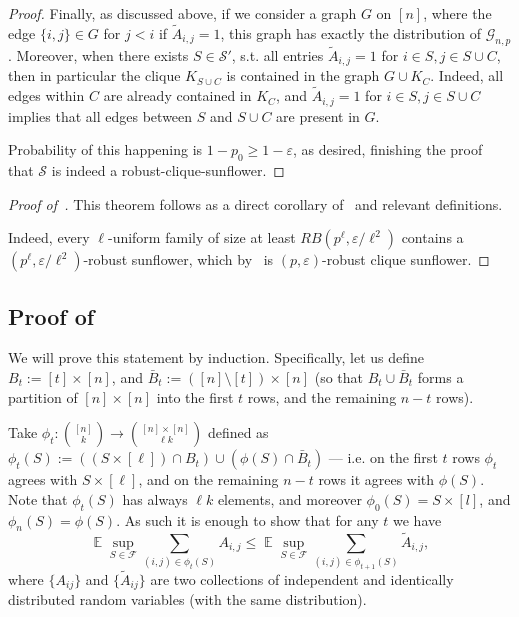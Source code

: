 \documentclass[10pt,a4paper]{article}
\DeclareMathOperator{\E}{\mathbb{E}}
\begin{document}
\begin{proof}
Finally, as discussed above, if we consider a graph $G$ on $[n]$, where the edge $\{i,j\} \in G$ for $j < i$ if $\tilde{A}_{i,j} = 1$, this graph has exactly the distribution of $\mathcal{G}_{n,p}$. Moreover, when there exists $S \in \mathcal{S}'$, s.t. all entries $\tilde{A}_{i,j} = 1$ for $i \in S, j \in S \cup C$, then in particular the clique $K_{S \cup C}$ is contained in the graph $G \cup K_C$. Indeed, all edges within $C$ are already contained in $K_C$, and $\tilde{A}_{i,j} = 1$ for $i \in S, j \in S \cup C$ implies that all edges between $S$ and $S \cup C$ are present in $G$.

Probability of this happening is $1-p_0 \geq 1-\varepsilon$, as desired, finishing the proof that $\mathcal{S}$ is indeed a robust-clique-sunflower.
\end{proof}
\begin{proof}[Proof of~]
    This theorem follows as a direct corollary of~ and relevant definitions.

    Indeed, every $\ell$-uniform family of size at least $RB(p^\ell, \varepsilon/\ell^2)$ contains a $(p^\ell, \varepsilon/\ell^2)$-robust sunflower, which by~ is  $(p, \varepsilon)$-robust clique sunflower.
\end{proof}

\subsection{Proof of~\texorpdfstring{}{Lemma 3.2} \label{sec:proof-of-comparison-lemma}}

We will prove this statement by induction. Specifically, let us define $B_t := [t] \times [n]$, and $\bar{B}_t := ([n] \setminus [t]) \times [n]$ (so that $B_t \cup \bar{B}_t$ forms a partition of $[n]\times[n]$ into the first $t$ rows, and the remaining $n-t$ rows).

Take $\phi_t : \binom{[n]}{k} \to \binom{[n]\times [n]}{\ell k}$ defined as $\phi_t(S) := ((S \times [\ell]) \cap B_t) \cup (\phi(S) \cap \bar{B}_t)$ --- i.e. on the first $t$ rows $\phi_t$ agrees with $S \times [\ell]$, and on the remaining $n-t$ rows it agrees with $\phi(S)$. Note that $\phi_t(S)$ has always $\ell k$ elements, and moreover $\phi_0(S) = S\times [l]$, and $\phi_{n}(S) =\phi(S)$. As such it is enough to show that for any $t$ we have
\begin{equation}
\label{eqn:induction-step}
        \E \sup_{S \in \mathcal{F}} \sum_{(i, j) \in \phi_{t}(S)} A_{i,j} \leq \E \sup_{S \in \mathcal{F}} \sum_{(i,j) \in \phi_{t+1}(S)} \tilde{A}_{i,j},
\end{equation}
where $\{A_{ij}\}$ and $\{\tilde{A}_{ij}\}$ are two collections of independent and identically distributed random variables (with the same distribution).
\end{document}

